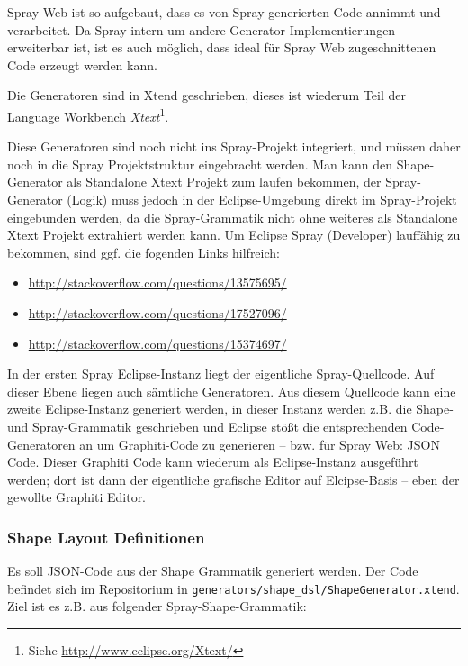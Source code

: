 Spray Web ist so aufgebaut, dass es von Spray generierten Code annimmt
und verarbeitet. Da Spray intern um andere Generator-Implementierungen
erweiterbar ist, ist es auch möglich, dass ideal für Spray Web
zugeschnittenen Code erzeugt werden kann.

Die Generatoren sind in Xtend geschrieben, dieses ist wiederum Teil
der Language Workbench
\emph{Xtext}\footnote{Siehe \url{http://www.eclipse.org/Xtext/}}.

Diese Generatoren sind noch nicht ins Spray-Projekt integriert, und müssen
daher noch in die Spray Projektstruktur eingebracht werden.
Man kann den Shape-Generator als Standalone Xtext Projekt zum laufen bekommen,
der Spray-Generator (Logik) muss jedoch in der Eclipse-Umgebung direkt
im Spray-Projekt eingebunden werden, da die Spray-Grammatik nicht ohne
weiteres als Standalone Xtext Projekt extrahiert werden kann.
Um Eclipse Spray (Developer) lauffähig zu bekommen, sind ggf. die fogenden
Links hilfreich:

\begin{itemize}
  \item \url{http://stackoverflow.com/questions/13575695/}
  \item \url{http://stackoverflow.com/questions/17527096/}
  \item \url{http://stackoverflow.com/questions/15374697/}
\end{itemize}

\noindent In der ersten Spray Eclipse-Instanz liegt der eigentliche
Spray-Quellcode. Auf dieser Ebene liegen auch sämtliche Generatoren.
Aus diesem Quellcode kann eine zweite Eclipse-Instanz generiert werden,
in dieser Instanz werden z.B. die Shape- und Spray-Grammatik geschrieben
und Eclipse stößt die entsprechenden Code-Generatoren an um Graphiti-Code
zu generieren -- bzw. für Spray Web: JSON Code.
Dieser Graphiti Code kann wiederum als Eclipse-Instanz ausgeführt werden;
dort ist dann der eigentliche grafische Editor auf Elcipse-Basis -- eben
der gewollte Graphiti Editor.

\subsubsection{Shape Layout Definitionen}

Es soll JSON-Code aus der Shape Grammatik \citep[gemäß][]{sprayUser}
generiert werden. Der Code befindet sich im Repositorium in
{\tt generators/shape\_dsl/ShapeGenerator.xtend}.
Ziel ist es z.B. aus folgender Spray-Shape-Grammatik:

